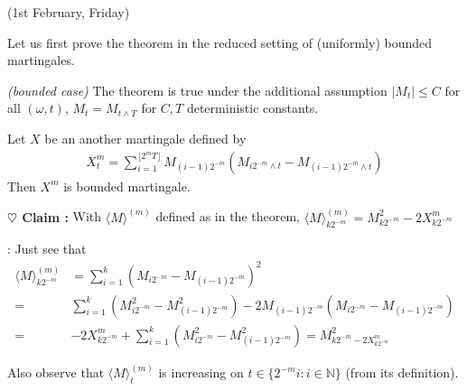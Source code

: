 \documentclass[12pt,a4paper]{article}
\newenvironment{proof}
{\begin{changemargin}{0.5cm}{0.5cm} 
	}%
	{\end{changemargin}
}
\newenvironment{subproof}
{\begin{changemargin}{0.5cm}{0.5cm} 
	}%
	{\end{changemargin}
}
\newenvironment{p}
{\begin{proof} 
	}%
	{\end{proof}
}
\begin{document}
\newday

(1st February, Friday)
\s

Let us first prove the theorem in the reduced setting of (uniformly) bounded martingales.
\s

\lem \emph{(bounded case)} The theorem is true under the additional assumption $|M_t|\leq C$ for all $(\omega, t)$, $M_t = M_{t\wedge T}$ for $C,T$ deterministic constants.
\begin{p}
\pf Let $X$ be an another martingale defined by
\begin{align*}
X_t^m = \sum_{i=1}^{\lfloor 2^m T \rfloor} M_{(i-1)2^{-m}} (M_{i2^{-m}\wedge t} - M_{(i-1)2^{-m}\wedge t})
\end{align*}
Then $X^m$ is bounded martingale.
\s

\textbf{$\heartsuit$ Claim :} With $\langle M \rangle^{(m)}$ defined as in the theorem, $\langle M\rangle_{k2^{-m}}^{(m)} = M^2_{k2^{-m}} - 2X^m_{k2^{-m}}$
\begin{subproof}
: Just see that \begin{align*}
\langle M\rangle_{k2^{-m}}^{(m)} &= \sum_{i=1}^k (M_{i2^{-m}} - M_{(i-1)2^{-m}} )^2 \\
=& \sum_{i=1}^{k} (M^2_{i2^{-m}} - M^2_{(i-1)2^{-m}}) - 2M_{(i-1)2^{-m}} (M_{i2^{-m}} - M_{(i-1)2^{-m}}) \\
=& -2X^m_{k2^{-m}} + \sum_{i=1}^k (M^2_{i2^{-m}} - M^2_{(i-1)2^{-m}}) = M^2_{k2^{-m} - 2X^m_{k2^{-m}}}
\end{align*}

Also observe that $\langle M \rangle_t^{(m)}$ is increasing on $t\in \{2^{-m}i : i\in\mathbb{N} \}$ (from its definition).
\end{subproof}
\s


\end{p}
\end{document}
